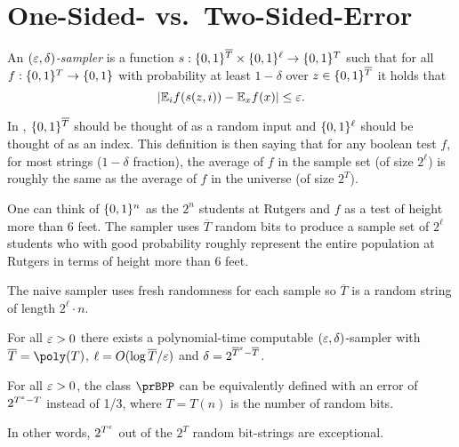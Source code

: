 \section{One-Sided- vs.\ Two-Sided-Error}


\begin{definition}\label{def:sampler}
  An \emph{$(\varepsilon, \delta)$-sampler} is a function $s :
  \{0,1\}^{\overline{T}} \times \{0,1\}^\ell \to \{0,1\}^T$ such that for
  all $f : \{0,1\}^T \to \{0,1\}$ with probability at least $1 - \delta$ 
  over $z \in \{0,1\}^{\overline{T}}$ it holds that \[
    |\mathbb{E}_i f(s(z, i)) - \mathbb{E}_x f(x)| \le \varepsilon.
  \]
\end{definition}

In , $\{0,1\}^{\overline{T}}$ should be thought of as a random input and $\{0,1\}^\ell$ should be thought of as an index. This definition is then saying that for any boolean test $f$, for most strings ($1-\delta$ fraction), the average of $f$ in the sample set (of size $2^{\ell}$) is roughly the same as the average of $f$ in the universe (of size $2^T$).

One can think of $\{0,1\}^n$ as the $2^n$ students at Rutgers and $f$ as a test of height more than $6$ feet. The sampler uses $\overline{T}$ random bits to produce a sample set of $2^\ell$ students who with good probability roughly represent the entire population at Rutgers in terms of height more than $6$ feet.

The naive sampler uses fresh randomness for each sample so $\overline{T}$ is a random string of length $2^\ell \cdot n$.

\begin{theorem}
  For all $\varepsilon > 0$ there exists a polynomial-time computable $(\varepsilon,
  \delta)$-sampler with $\overline{T} = \poly(T)$, $\ell = O(\log
  \overline{T}/\varepsilon)$ and $\delta = 2^{\overline{T}^\varepsilon - \overline{T}}$.
\end{theorem}

\begin{corollary}\label{cor:bpp-small-random}
  For all $\varepsilon > 0$, the class $\prBPP$ can be equivalently defined with an
  error of $2^{T^\varepsilon - T}$ instead of 1/3, where $T = T(n)$ is the number of
  random bits.

  In other words, $2^{T^\varepsilon}$ out of the $2^T$ random bit-strings are exceptional.
\end{corollary}

